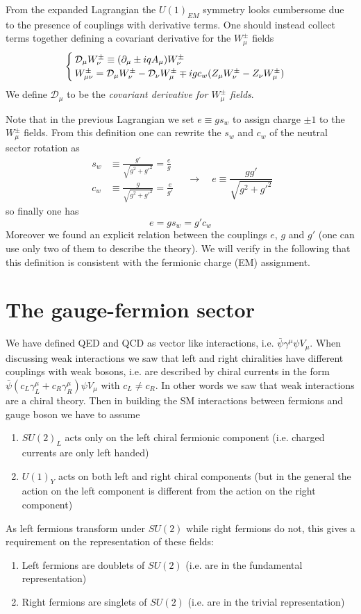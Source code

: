 \documentclass[TheoreticalPhy_ModB.tex]{subfiles}
\begin{document}
From the expanded Lagrangian the $U(1)_{EM}$ symmetry looks cumbersome due to the presence of couplings with derivative terms. One should instead collect terms together defining a covariant derivative for the $W_\mu^\pm$ fields
\[\begin{cases}
\mathcal D_\mu W_\nu ^\pm\equiv(\partial_{\mu}\pm iqA_\mu)W_\nu^\pm\\
W_{\mu\nu}^\pm=\mathcal D_\mu W_\nu^\pm-\mathcal D_\nu W_\mu^\pm\mp igc_w(Z_\mu W_\nu ^\pm-Z_\nu W_\mu^\pm)
\end{cases}\]
We define $\mathcal D_\mu$ to be the \emph{covariant derivative for $W_\mu^\pm$ fields}. 

Note that in the previous Lagrangian we set $e\equiv gs_w$ to assign charge $\pm1$ to the $W_\mu^\pm$ fields. From this definition one can rewrite the $s_w$ and $c_w$ of the neutral sector rotation as
\[\begin{aligned}
s_w&\equiv\frac{g'}{\sqrt{g^2+g'^2}}=\frac eg\\
c_w&\equiv\frac{g}{\sqrt{g^2+g'^2}}=\frac e{g'}
\end{aligned}
\quad\to\quad e\equiv\frac{gg'}{\sqrt{g^2+g'^2}}\]
so finally one has
\[e=gs_w=g'c_w\]
Moreover we found an explicit relation between the couplings $e$, $g$ and $g'$ (one can use only two of them to describe the theory).
We will verify in the following that this definition is consistent with the fermionic charge (EM) assignment. 




\section{The gauge-fermion sector}

We have defined QED and QCD as vector like interactions, i.e. $\bar\psi\gamma^\mu\psi V_\mu$. When discussing weak interactions we saw that left and right chiralities have different couplings with weak bosons, i.e. are described by chiral currents in the form $\bar\psi(c_L\gamma^\mu_L+c_R\gamma^\mu_R)\psi V_\mu$ with $c_L\neq c_R$.
In other words we saw that weak interactions are a chiral theory. 
Then in building the SM interactions between fermions and gauge boson we have to assume
\begin{enumerate}
\item $SU(2)_L$ acts only on the left chiral fermionic component (i.e. charged currents are only left handed)
\item $U(1)_Y$ acts on both left and right chiral components (but in the general the action on the left component is different from the action on the right component)
\end{enumerate}
As left fermions transform under $SU(2)$ while right fermions do not, this gives a requirement on the representation of these fields:
\begin{enumerate}
\item Left fermions are doublets of $SU(2)$ (i.e. are in the fundamental representation)
\item Right fermions are singlets of $SU(2)$ (i.e. are in the trivial representation)
\end{enumerate}
\end{document}
